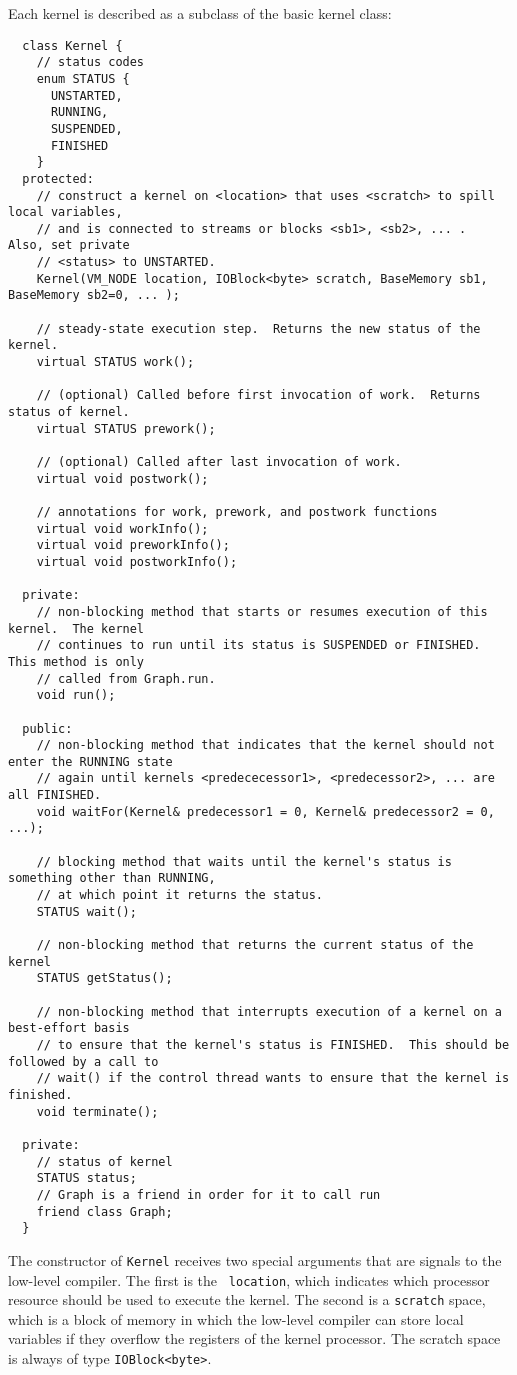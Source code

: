Each kernel is described as a subclass of the basic kernel class:
{\small
\begin{verbatim}
  class Kernel {
    // status codes
    enum STATUS {
      UNSTARTED,
      RUNNING,
      SUSPENDED,
      FINISHED
    }
  protected:
    // construct a kernel on <location> that uses <scratch> to spill local variables,
    // and is connected to streams or blocks <sb1>, <sb2>, ... .  Also, set private 
    // <status> to UNSTARTED.
    Kernel(VM_NODE location, IOBlock<byte> scratch, BaseMemory sb1, BaseMemory sb2=0, ... );

    // steady-state execution step.  Returns the new status of the kernel.
    virtual STATUS work();

    // (optional) Called before first invocation of work.  Returns status of kernel.
    virtual STATUS prework();

    // (optional) Called after last invocation of work.
    virtual void postwork();

    // annotations for work, prework, and postwork functions
    virtual void workInfo();
    virtual void preworkInfo();
    virtual void postworkInfo();

  private:
    // non-blocking method that starts or resumes execution of this kernel.  The kernel 
    // continues to run until its status is SUSPENDED or FINISHED.  This method is only
    // called from Graph.run.
    void run();
   
  public:
    // non-blocking method that indicates that the kernel should not enter the RUNNING state
    // again until kernels <predececessor1>, <predecessor2>, ... are all FINISHED.
    void waitFor(Kernel& predecessor1 = 0, Kernel& predecessor2 = 0, ...);

    // blocking method that waits until the kernel's status is something other than RUNNING,
    // at which point it returns the status.
    STATUS wait();

    // non-blocking method that returns the current status of the kernel
    STATUS getStatus();

    // non-blocking method that interrupts execution of a kernel on a best-effort basis 
    // to ensure that the kernel's status is FINISHED.  This should be followed by a call to 
    // wait() if the control thread wants to ensure that the kernel is finished.
    void terminate();

  private:
    // status of kernel
    STATUS status;
    // Graph is a friend in order for it to call run
    friend class Graph;
  }  
\end{verbatim}}
The constructor of {\tt Kernel} receives two special arguments that
are signals to the low-level compiler.  The first is the {\tt
location}, which indicates which processor resource should be used to
execute the kernel.  The second is a {\tt scratch} space, which is a
block of memory in which the low-level compiler can store local
variables if they overflow the registers of the kernel processor.  The
scratch space is always of type {\tt IOBlock<byte>}.  

